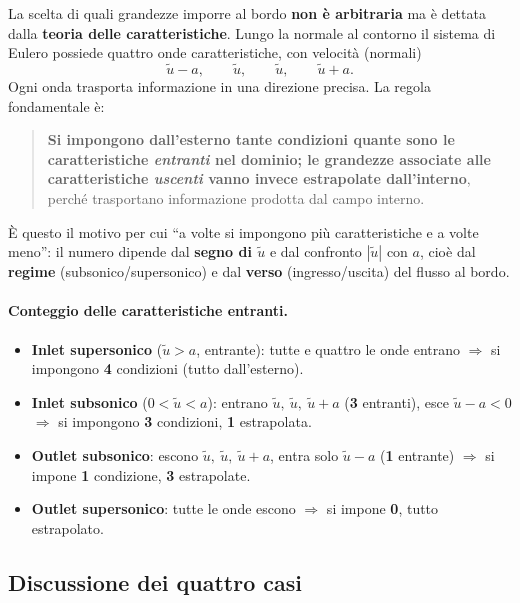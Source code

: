 La scelta di quali grandezze imporre al bordo \textbf{non è arbitraria} ma è dettata
dalla \textbf{teoria delle caratteristiche}. Lungo la normale al contorno il sistema di
Eulero possiede quattro onde caratteristiche, con velocità (normali)
\[
  \tilde u - a, \qquad \tilde u, \qquad \tilde u, \qquad \tilde u + a .
\]
Ogni onda trasporta informazione in una direzione precisa. La regola fondamentale è:
\begin{quote}
\textbf{Si impongono dall'esterno tante condizioni quante sono le caratteristiche
\emph{entranti} nel dominio; le grandezze associate alle caratteristiche \emph{uscenti}
vanno invece estrapolate dall'interno}, perché trasportano informazione prodotta dal
campo interno.
\end{quote}
È questo il motivo per cui ``a volte si impongono più caratteristiche e a volte meno'':
il numero dipende dal \textbf{segno di $\tilde u$} e dal confronto $|\tilde u|$ con $a$,
cioè dal \textbf{regime} (subsonico/supersonico) e dal \textbf{verso} (ingresso/uscita)
del flusso al bordo.

\paragraph{Conteggio delle caratteristiche entranti.}
\begin{itemize}
  \item \textbf{Inlet supersonico} ($\tilde u > a$, entrante): tutte e quattro le onde
    entrano $\Rightarrow$ si impongono \textbf{4} condizioni (tutto dall'esterno).
  \item \textbf{Inlet subsonico} ($0<\tilde u<a$): entrano $\tilde u,\ \tilde u,\
    \tilde u+a$ (\textbf{3} entranti), esce $\tilde u-a<0$ $\Rightarrow$ si impongono
    \textbf{3} condizioni, \textbf{1} estrapolata.
  \item \textbf{Outlet subsonico}: escono $\tilde u,\ \tilde u,\ \tilde u+a$, entra solo
    $\tilde u-a$ (\textbf{1} entrante) $\Rightarrow$ si impone \textbf{1} condizione,
    \textbf{3} estrapolate.
  \item \textbf{Outlet supersonico}: tutte le onde escono $\Rightarrow$ si impone
    \textbf{0}, tutto estrapolato.
\end{itemize}

\subsection{Discussione dei quattro casi}


